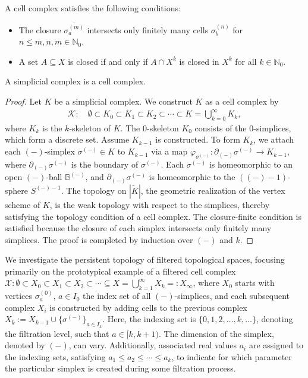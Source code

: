 \begin{remark}
A cell complex satisfies the following conditions:
\begin{itemize}
    \item The closure \(\overline{\sigma^{(m)}_a}\) intersects only finitely many cells \(\sigma^{(n)}_b\) for \(n \leq m, n,m \in \mathbb{N}_0\).
    \item A set \(A \subseteq X\) is closed if and only if \(A \cap X^k\) is closed in \(X^k\) for all \(k \in \mathbb{N}_0\).
\end{itemize}
\end{remark}

\begin{proposition}
A simplicial complex is a cell complex.
\end{proposition}

\begin{proof}
Let \(K\) be a simplicial complex. We construct \(K\) as a cell complex by
\begin{align}
\mathcal{K}: \quad \emptyset \subset K_0 \subset K_1 \subset K_2 \subset \cdots \subset K = \bigcup_{k=0}^{\infty} K_k,
\end{align}
where \(K_k\) is the \(k\)-skeleton of \(K\). The $0$-skeleton \(K_0\) consists of the $0$-simplices, which form a discrete set. Assume \(K_{k-1}\) is constructed. To form \(K_k\), we attach each \((-)\)-simplex \(\sigma^{(-)} \in K\) to \(K_{k-1}\) via a map \(\varphi_{\sigma^{(-)}} : \partial_{(-)} \sigma^{(-)} \to K_{k-1}\), where \(\partial_{(-)} \sigma^{(-)}\) is the boundary of \(\sigma^{(-)}\). Each \(\sigma^{(-)}\) is homeomorphic to an open \((-)\)-ball \(\mathbb{B}^{(-)}\), and \(\partial_{(-)} \sigma^{(-)}\) is homeomorphic to the \(((-)-1)\)-sphere \(S^{(-)-1}\). The topology on \(|\tilde{K}|\), the geometric realization of the vertex scheme of \(K\), is the weak topology with respect to the simplices, thereby satisfying the topology condition of a cell complex. The closure-finite condition is satisfied because the closure of each simplex intersects only finitely many simplices. The proof is completed by induction over $(-)$ and $k$.
\end{proof}

We investigate the persistent topology of filtered topological spaces, focusing primarily on the prototypical example of a filtered cell complex $\mathcal{X}: \emptyset \subset X_{0} \subset X_{1} \subset X_{2} \subset \cdots \subseteq X = \bigcup_{k=1}^{\infty} X_{k} =: X_\infty$, where \(X_{0}\) starts with vertices \(\sigma^{(0)}_a\), $a \in I_0$ the index set of all $(-)$-simplices, and each subsequent complex \(X_{i}\) is constructed by adding cells to the previous complex $X_{k} := X_{k-1} \cup \{\sigma^{(-)}\}_{a \in I_{k}}$. Here, the indexing set is \(\{0, 1, 2, \ldots, k, \ldots\}\), denoting the filtration level, such that $a \in [k,k+1)$. The dimension of the simplex, denoted by $(-)$, can vary. Additionally, associated real values \(a_{i}\) are assigned to the indexing sets, satisfying \(a_{1} \leq a_{2} \leq \cdots \leq a_{k}\), to indicate for which parameter the particular simplex is created during some filtration process.

